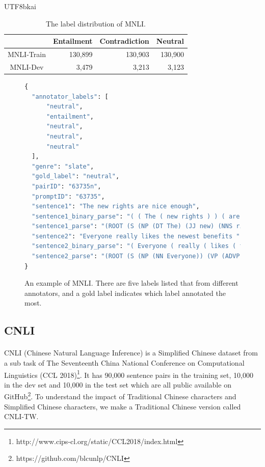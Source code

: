 \documentclass{article}
\begin{document}
\begin{CJK*}{UTF8}{bkai}
\begin{table}[ht!]
  \centering
  \begin{tabular}{|c|r|r|r|}
  \hline
  \multicolumn{1}{|l|}{} & \multicolumn{1}{c|}{Entailment} & \multicolumn{1}{c|}{Contradiction} & \multicolumn{1}{c|}{Neutral} \\ \hline
  MNLI-Train & 130,899 & 130,903 & 130,900 \\ \hline
  MNLI-Dev & 3,479 & 3,213 & 3,123 \\ \hline
  \end{tabular}
  \caption{The label distribution of MNLI.}
\end{table}

\begin{figure}
\caption[An example of MNLI]{An example of MNLI. There are five labels listed that from different annotators, and a gold label indicates which label annotated the most.}
\begin{minipage}{\linewidth}
\begin{lstlisting}[language=Python]
{
  "annotator_labels": [
      "neutral",
      "entailment",
      "neutral",
      "neutral",
      "neutral"
  ],
  "genre": "slate",
  "gold_label": "neutral",
  "pairID": "63735n",
  "promptID": "63735",
  "sentence1": "The new rights are nice enough",
  "sentence1_binary_parse": "( ( The ( new rights ) ) ( are ( nice enough ) ) )",
  "sentence1_parse": "(ROOT (S (NP (DT The) (JJ new) (NNS rights)) (VP (VBP are) (ADJP (JJ nice) (RB enough)))))",
  "sentence2": "Everyone really likes the newest benefits ",
  "sentence2_binary_parse": "( Everyone ( really ( likes ( the ( newest benefits ) ) ) ) )",
  "sentence2_parse": "(ROOT (S (NP (NN Everyone)) (VP (ADVP (RB really)) (VBZ likes) (NP (DT the) (JJS newest) (NNS benefits)))))"
}
\end{lstlisting}
\end{minipage}
\end{figure}

\subsection{CNLI}
\paragraph{}
CNLI (Chinese Natural Language Inference) is a Simplified Chinese dataset from a sub task of The Seventeenth China National Conference on Computational Linguistics (CCL 2018)\footnote{http://www.cips-cl.org/static/CCL2018/index.html}. It has 90,000 sentence pairs in the training set, 10,000 in the dev set and 10,000 in the test set which are all public available on GitHub\footnote{https://github.com/blcunlp/CNLI}. To understand the impact of Traditional Chinese characters and Simplified Chinese characters, we make a Traditional Chinese version called CNLI-TW.


\end{CJK*}
\end{document}
